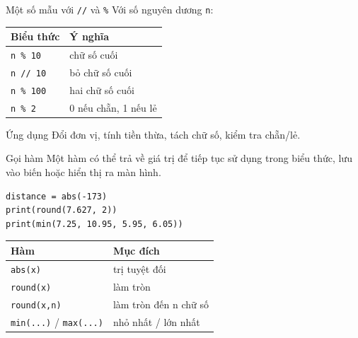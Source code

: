 \documentclass[aspectratio=169,10pt]{beamer}
\begin{document}
\begin{frame}{Một số mẫu với \texttt{//} và \texttt{\%}}
Với số nguyên dương \texttt{n}:
\begin{table}
\centering
\begin{tabular}{ll}
\toprule
Biểu thức & Ý nghĩa \\
\midrule
\texttt{n \% 10} & chữ số cuối \\
\texttt{n // 10} & bỏ chữ số cuối \\
\texttt{n \% 100} & hai chữ số cuối \\
\texttt{n \% 2} & 0 nếu chẵn, 1 nếu lẻ \\
\bottomrule
\end{tabular}
\end{table}
\begin{block}{Ứng dụng}
Đổi đơn vị, tính tiền thừa, tách chữ số, kiểm tra chẵn/lẻ.
\end{block}
\end{frame}

\begin{frame}[fragile]{Gọi hàm}
Một hàm có thể trả về giá trị để tiếp tục sử dụng trong biểu thức, lưu vào biến hoặc hiển thị ra màn hình.
\begin{lstlisting}
distance = abs(-173)
print(round(7.627, 2))
print(min(7.25, 10.95, 5.95, 6.05))
\end{lstlisting}
\begin{table}
\centering
\begin{tabular}{ll}
\toprule
Hàm & Mục đích \\
\midrule
\texttt{abs(x)} & trị tuyệt đối \\
\texttt{round(x)} & làm tròn \\
\texttt{round(x,n)} & làm tròn đến n chữ số \\
\texttt{min(...)} / \texttt{max(...)} & nhỏ nhất / lớn nhất \\
\bottomrule
\end{tabular}
\end{table}
\end{frame}
\end{document}
